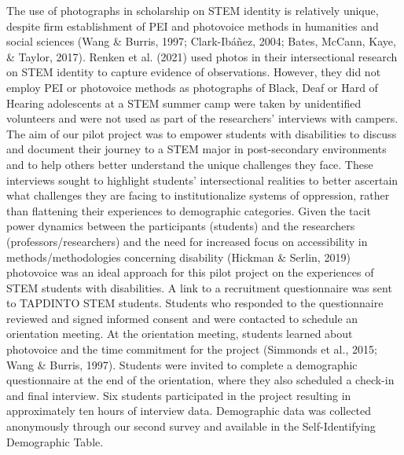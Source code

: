 \documentclass{sig-alternate} %
\begin{document}
\begin{large}
The use of photographs in scholarship on STEM identity is relatively unique, despite firm establishment of PEI and photovoice methods in humanities and social sciences (Wang \& Burris, 1997; Clark-Ibáñez, 2004; Bates, McCann, Kaye, \& Taylor, 2017). Renken et al. (2021) used photos in their intersectional research on STEM identity to capture evidence of observations. However, they did not employ PEI or photovoice methods as photographs of Black, Deaf or Hard of Hearing adolescents at a STEM summer camp were taken by unidentified volunteers and were not used as part of the researchers’ interviews with campers. The aim of our pilot project was to empower students with disabilities to discuss and document their journey to a STEM major in post-secondary environments and to help others better understand the unique challenges they face. These interviews sought to highlight students’ intersectional realities to better ascertain what challenges they are facing to institutionalize systems of oppression, rather than flattening their experiences to demographic categories. Given the tacit power dynamics between the participants (students) and the researchers (professors/researchers) and the need for increased focus on accessibility in methods/methodologies concerning disability (Hickman \& Serlin, 2019) photovoice was an ideal approach for this pilot project on the experiences of STEM students with disabilities. A link to a recruitment questionnaire was sent to TAPDINTO STEM students. Students who responded to the questionnaire reviewed and signed informed consent and were contacted to schedule an orientation meeting. At the orientation meeting, students learned about photovoice and the time commitment for the project (Simmonds et al., 2015; Wang \& Burris, 1997). Students were invited to complete a demographic questionnaire at the end of the orientation, where they also scheduled a check-in and final interview. Six students participated in the project resulting in approximately ten hours of interview data. Demographic data was collected anonymously through our second survey and available in the Self-Identifying Demographic Table.



\end{large}
\end{document}
